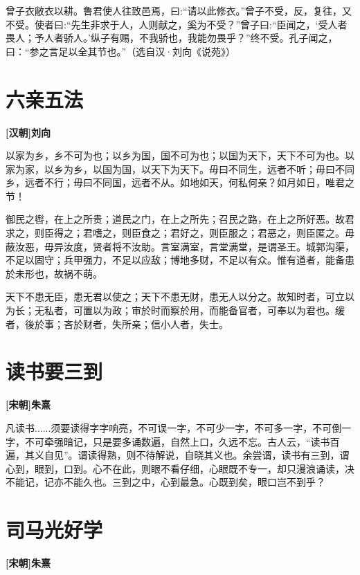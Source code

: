 \documentclass[UTF8,titlepage,oneside]{ctexbook}
\begin{document}
曾子衣敝衣以耕。鲁君使人往致邑焉，曰:“请以此修衣。”曾子不受，反，复往，又不受。使者曰:“先生非求于人，人则献之，奚为不受？”曾子曰:“臣闻之，‘受人者畏人；予人者骄人。’纵子有赐，不我骄也，我能勿畏乎？”终不受。孔子闻之，曰：“参之言足以全其节也。”（选自汉·刘向《说苑》）



\chapter*{六亲五法}
\begin{center}
	\textbf{[汉朝]刘向}
\end{center}


以家为乡，乡不可为也；以乡为国，国不可为也；以国为天下，天下不可为也。以家为家，以乡为乡，以国为国，以天下为天下。毋曰不同生，远者不听；毋曰不同乡，远者不行；毋曰不同国，远者不从。如地如天，何私何亲？如月如日，唯君之节！


御民之辔，在上之所贵；道民之门，在上之所先；召民之路，在上之所好恶。故君求之，则臣得之；君嗜之，则臣食之；君好之，则臣服之；君恶之，则臣匿之。毋蔽汝恶，毋异汝度，贤者将不汝助。言室满室，言堂满堂，是谓圣王。城郭沟渠，不足以固守；兵甲强力，不足以应敌；博地多财，不足以有众。惟有道者，能备患於未形也，故祸不萌。


天下不患无臣，患无君以使之；天下不患无财，患无人以分之。故知时者，可立以为长；无私者，可置以为政；审於时而察於用，而能备官者，可奉以为君也。缓者，後於事；吝於财者，失所亲；信小人者，失士。



\chapter*{读书要三到}
\begin{center}
	\textbf{[宋朝]朱熹}
\end{center}

凡读书......须要读得字字响亮，不可误一字，不可少一字，不可多一字，不可倒一字，不可牵强暗记，只是要多诵数遍，自然上口，久远不忘。古人云，“读书百遍，其义自见”。谓读得熟，则不待解说，自晓其义也。余尝谓，读书有三到，谓心到，眼到，口到。心不在此，则眼不看仔细，心眼既不专一，却只漫浪诵读，决不能记，记亦不能久也。三到之中，心到最急。心既到矣，眼口岂不到乎？


\chapter*{司马光好学}
\begin{center}
	\textbf{[宋朝]朱熹}
\end{center}
\end{document}
